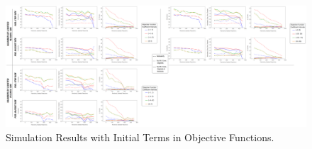 \begin{landscape}
	\begin{figure}[ht]
		\centering
		\vspace*{1.5cm}
		\hspace*{-1.2cm}
		\includegraphics[width=1.6\textwidth]{../images/supplements-obj_func_terms_initial-simulation-results.png}
		\caption{Simulation Results with Initial Terms in Objective Functions.}
		\label{figure-supplements-obj_func-terms-initial}
	\end{figure}
\end{landscape}